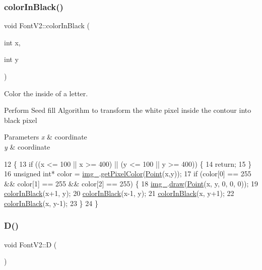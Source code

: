\subsubsection{\texorpdfstring{color\+In\+Black()}{colorInBlack()}}
{\footnotesize\ttfamily void Font\+V2\+::color\+In\+Black (\begin{DoxyParamCaption}\item[{int}]{x,  }\item[{int}]{y }\end{DoxyParamCaption})}



Color the inside of a letter. 

Perform Seed fill Algorithm to transform the white pixel inside the contour into black pixel 
\begin{DoxyParams}{Parameters}
{\em x} & coordinate \\
\hline
{\em y} & coordinate \\
\hline
\end{DoxyParams}

\begin{DoxyCode}
12                                       \{
13     \textcolor{keywordflow}{if} ((x <= 100 || x >= 400) || (y <= 100 || y >= 400)) \{
14         \textcolor{keywordflow}{return};
15     \}
16     \textcolor{keywordtype}{unsigned} \textcolor{keywordtype}{int}* color = \mbox{\hyperlink{class_font_v1_a00569e3e3c4b70f437b63f396f735fb0}{img\_}}.\mbox{\hyperlink{class_image_adb23176701dae47479d4919f55f3aec5}{getPixelColor}}(\mbox{\hyperlink{class_point}{Point}}(x,y));
17     \textcolor{keywordflow}{if} (color[0] == 255 \&\& color[1] == 255 \&\& color[2] == 255) \{
18         \mbox{\hyperlink{class_font_v1_a00569e3e3c4b70f437b63f396f735fb0}{img\_}}.\mbox{\hyperlink{class_image_a8d162f3cab956131d58708c09aa560b0}{draw}}(\mbox{\hyperlink{class_point}{Point}}(x, y, 0, 0, 0));
19         \mbox{\hyperlink{class_font_v2_a04f2501961bc286ce70fbb6a840b0e8a}{colorInBlack}}(x+1, y);
20         \mbox{\hyperlink{class_font_v2_a04f2501961bc286ce70fbb6a840b0e8a}{colorInBlack}}(x-1, y);
21         \mbox{\hyperlink{class_font_v2_a04f2501961bc286ce70fbb6a840b0e8a}{colorInBlack}}(x, y+1);
22         \mbox{\hyperlink{class_font_v2_a04f2501961bc286ce70fbb6a840b0e8a}{colorInBlack}}(x, y-1);
23     \}
24 \}
\end{DoxyCode}
\mbox{\label{class_font_v2_ab6a088abff91bacc1096b6008296142b}} 
\subsubsection{\texorpdfstring{D()}{D()}}
{\footnotesize\ttfamily void Font\+V2\+::D (\begin{DoxyParamCaption}{ }\end{DoxyParamCaption})}




